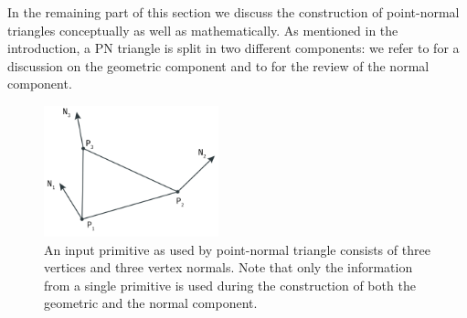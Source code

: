 In the remaining part of this section we discuss the construction of point-normal triangles conceptually as well as mathematically. As mentioned in the introduction, a PN triangle is split in two different components: we refer to  for a discussion on the geometric component and to  for the review of the normal component.

\begin{figure}
	\centering
	\includegraphics[width=0.45\textwidth]{./content/img/method/input.png}
	\caption{An input primitive as used by point-normal triangle consists of three vertices and three vertex normals. Note that only the information from a single primitive is used during the construction of both the geometric and the normal component.}
	\label{fig:method:input_primitive}
\end{figure}

% 

% 
